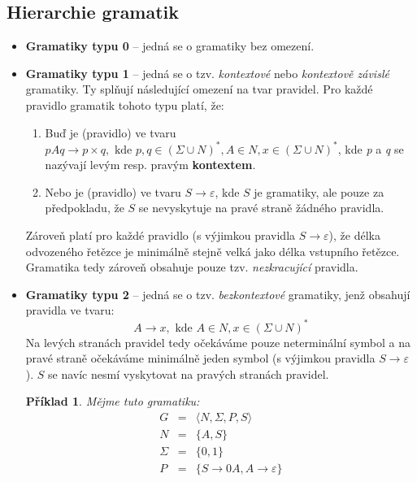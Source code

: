 \documentclass[10pt, a4paper, titlepage]{article}
\theoremstyle{note}
\newtheorem{priklad}{\textbf{Příklad}}
\begin{document}
\subsection{Hierarchie gramatik}
\begin{itemize}
\item
\textbf{Gramatiky typu 0} -- jedná se o gramatiky bez omezení.

\item
\textbf{Gramatiky typu 1\label{gram-1}} -- jedná se o tzv. \emph{kontextové} nebo \emph{kontextově závislé} gramatiky.
Ty splňují následující omezení na tvar pravidel. Pro každé pravidlo gramatik tohoto typu platí, že:
\begin{enumerate}
\item
Buď je (pravidlo) ve tvaru $pAq \rightarrow p \times q, \text{ kde } p, q \in (\Sigma \cup N)^{*}, A \in N, x \in (\Sigma \cup N)^{*}$, kde \emph{p} a \emph{q}
se nazývají levým resp. pravým \textbf{kontextem}.

\item
Nebo je (pravidlo) ve tvaru $S \rightarrow \varepsilon$, kde $S$ je  gramatiky, ale pouze
za předpokladu, že $S$ se nevyskytuje na pravé straně žádného pravidla.
\end{enumerate}

Zároveň platí pro každé pravidlo (s výjimkou pravidla $S \rightarrow \varepsilon$), že délka odvozeného řetězce je minimálně stejně velká jako délka vstupního řetězce. Gramatika tedy zároveň obsahuje pouze tzv. \emph{nezkracující} pravidla.

\item
\textbf{Gramatiky typu 2} -- jedná se o tzv. \emph{bezkontextové} gramatiky, jenž obsahují pravidla ve tvaru:
$$
A \rightarrow x, \text{ kde } A \in N, x \in (\Sigma \cup N)^{*}
$$
Na levých stranách pravidel tedy očekáváme pouze neterminální symbol a na pravé straně očekáváme minimálně jeden symbol (s výjimkou pravidla $S \rightarrow \varepsilon$). $S$ se navíc nesmí vyskytovat na pravých stranách pravidel.

\begin{priklad}
Mějme tuto gramatiku:
\begin{eqnarray*}
G &=& \langle N, \Sigma, P, S \rangle \\
N &=& \lbrace A, S \rbrace \\
\Sigma &=& \lbrace 0, 1 \rbrace \\
P &=& \lbrace S \rightarrow 0A, A \rightarrow \varepsilon \rbrace
\end{eqnarray*}
\end{priklad}


\end{itemize}
\end{document}
